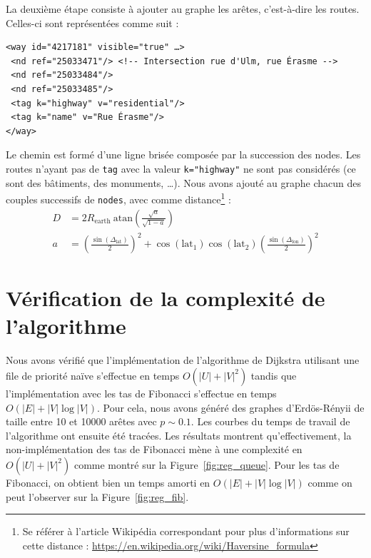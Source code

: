 \documentclass{article}
\begin{document}
La deuxième étape consiste à ajouter au graphe les arêtes,
c'est-à-dire les routes. Celles-ci sont représentées comme suit :
\begin{verbatim}
<way id="4217181" visible="true" …>
 <nd ref="25033471"/> <!-- Intersection rue d'Ulm, rue Érasme -->
 <nd ref="25033484"/>
 <nd ref="25033485"/>
 <tag k="highway" v="residential"/>
 <tag k="name" v="Rue Érasme"/>
</way>
\end{verbatim}
Le chemin est formé d'une ligne brisée composée par la succession des nodes.
Les routes n'ayant pas de \verb|tag| avec la valeur \verb|k="highway"|
ne sont pas considérés (ce sont des bâtiments, des monuments, …). Nous
avons ajouté au graphe chacun des couples successifs de \verb|nodes|, avec
comme distance\footnote{Se référer à l'article Wikipédia correspondant pour plus d'informations sur cette distance : \url{https://en.wikipedia.org/wiki/Haversine_formula}} :
\begin{align*}
  D & = 2 R_\mathrm{earth}\ \mathrm{atan} \left( \frac{\sqrt{a}}{\sqrt{1-a}} \right) \\
  a & = \left( \frac{\sin(\Delta_\mathrm{lat})}{2} \right)^2 +
      \cos(\mathrm{lat_1})\cos(\mathrm{lat_2}) \left( \frac{\sin(\Delta_\mathrm{lon})}{2} \right)^2
\end{align*}

\section{Vérification de la complexité de l'algorithme}
Nous avons vérifié que l'implémentation de l'algorithme de Dijkstra
utilisant une file de priorité naïve s'effectue en temps $O(|U| + |V|^2)$ tandis
que l'implémentation avec les tas de Fibonacci s'effectue en temps
$O(|E| + |V|\log |V|)$. Pour cela, nous avons généré des graphes
d'Erdös-Rényii de taille entre 10 et 10000 arêtes avec $p\sim
0.1$. Les courbes du temps de travail de l'algorithme ont ensuite été
tracées. Les résultats montrent qu'effectivement, la
non-implémentation des tas de Fibonacci mène à une complexité en
$O(|U| + |V|^2)$ comme montré sur la Figure~\ref{fig:reg_queue}. Pour
les tas de Fibonacci, on obtient bien un temps amorti en $O(|E| +
|V|\log |V|)$ comme on peut l'observer sur la Figure~\ref{fig:reg_fib}.
\end{document}
